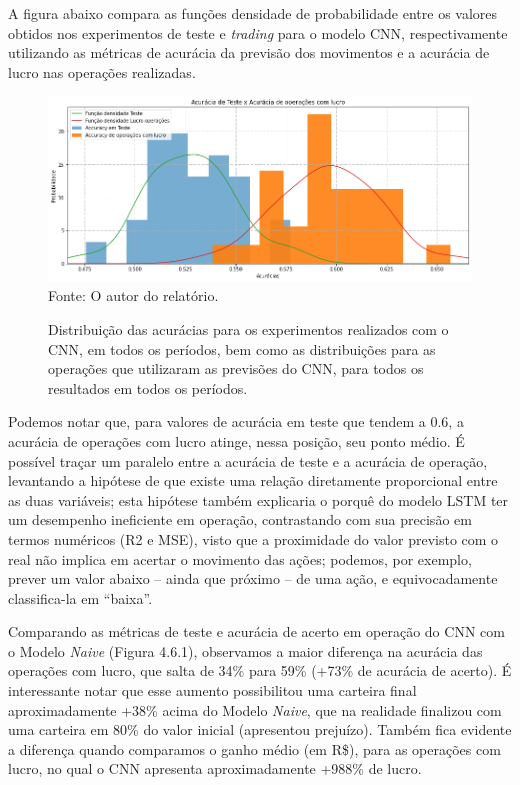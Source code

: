 \par
A figura abaixo compara as funções densidade de probabilidade entre os valores obtidos nos experimentos de teste e \textit{trading} para o modelo CNN, respectivamente utilizando as métricas de acurácia da previsão dos movimentos e a acurácia de lucro nas operações realizadas.

\begin{figure}[hbt]
\centering
\caption{\label{figure:figura1}Distribuição das acurácias para os experimentos realizados com o CNN, em todos os períodos, bem como as distribuições para as operações que utilizaram as previsões do CNN, para todos os resultados em todos os períodos.}
  \includegraphics[scale=0.5]{figures/img14.png}
  Fonte: O autor do relatório.
\end{figure}

\par
Podemos notar que, para valores de acurácia em teste que tendem a 0.6, a acurácia de operações com lucro atinge, nessa posição, seu ponto médio. É possível traçar um paralelo entre a acurácia de teste e a acurácia de operação, levantando a hipótese de que existe uma relação diretamente proporcional entre as duas variáveis; esta hipótese também explicaria o porquê do modelo LSTM ter um desempenho ineficiente em operação, contrastando com sua precisão em termos numéricos (R2 e MSE), visto que a proximidade do valor previsto com o real não implica em acertar o movimento das ações; podemos, por exemplo, prever um valor abaixo – ainda que próximo – de uma ação, e equivocadamente classifica-la em “baixa”.

\par
Comparando as métricas de teste e acurácia de acerto em operação do CNN com o Modelo \textit{Naive} (Figura 4.6.1), observamos a maior diferença na acurácia das operações com lucro, que salta de 34\% para 59\% (+73\% de acurácia de acerto). É interessante notar que esse aumento possibilitou uma carteira final aproximadamente +38\% acima do Modelo \textit{Naive}, que na realidade finalizou com uma carteira em 80\% do valor inicial (apresentou prejuízo). Também fica evidente a diferença quando comparamos o ganho médio (em R\$), para as operações com lucro, no qual o CNN apresenta aproximadamente +988\% de lucro.

